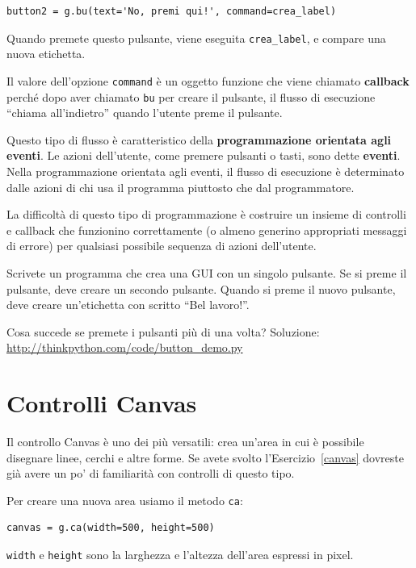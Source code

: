 \documentclass[10pt]{book}
\begin{document}
\begin{verbatim}
button2 = g.bu(text='No, premi qui!', command=crea_label)
\end{verbatim}
%
Quando premete questo pulsante, viene eseguita \verb"crea_label",
e compare una nuova etichetta.

Il valore dell'opzione {\tt command} è un oggetto funzione che viene chiamato {\bf callback} perché dopo aver chiamato {\tt bu} per creare il pulsante, il flusso di esecuzione ``chiama all'indietro'' quando l'utente preme il pulsante.

Questo tipo di flusso è caratteristico della {\bf programmazione orientata agli eventi}.
Le azioni dell'utente, come premere pulsanti o tasti, sono dette {\bf
eventi}.  Nella programmazione orientata agli eventi, il flusso di esecuzione è determinato dalle azioni di chi usa il programma piuttosto che dal programmatore.

La difficoltà di questo tipo di programmazione è costruire un insieme di controlli e callback che funzionino correttamente (o almeno generino appropriati messaggi di errore) per qualsiasi possibile sequenza di azioni dell'utente.

\vspace{0.2in}
\begin{exercise}

Scrivete un programma che crea una GUI con un singolo pulsante. Se si preme il pulsante, deve creare un secondo pulsante. Quando si preme il nuovo pulsante, deve creare un'etichetta con scritto ``Bel lavoro!''.

Cosa succede se premete i pulsanti più di una volta?
Soluzione: \url{http://thinkpython.com/code/button_demo.py}

\end{exercise}


\section{Controlli Canvas}

Il controllo Canvas è uno dei più versatili: crea un'area in cui è possibile disegnare linee, cerchi e altre forme. Se avete svolto l'Esercizio~\ref{canvas} dovreste già avere un po' di familiarità con controlli di questo tipo.

Per creare una nuova area usiamo il metodo {\tt ca}:

\begin{verbatim}
canvas = g.ca(width=500, height=500)
\end{verbatim}
%
{\tt width} e {\tt height} sono la larghezza e l'altezza dell'area espressi in pixel.
\end{document}
